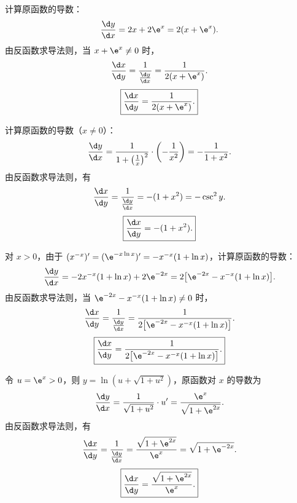 \begin{solution}

    计算原函数的导数：
    \begin{equation}
        \frac{\d y}{\d x} = 2x + 2\e^x = 2(x + \e^x).
    \end{equation}
    由反函数求导法则，当 $x + \e^x \neq 0$ 时，
    \begin{equation}
        \frac{\d x}{\d y} = \frac{1}{\frac{\d y}{\d x}} = \frac{1}{2(x + \e^x)}.
    \end{equation}
    \begin{equation}
        \boxed{\frac{\d x}{\d y} = \frac{1}{2(x + \e^x)}.}
    \end{equation}


    计算原函数的导数（$x \neq 0$）：
    \begin{equation}
        \frac{\d y}{\d x} = \frac{1}{1 + \left(\frac{1}{x}\right)^2} \cdot \left( -\frac{1}{x^2} \right) = -\frac{1}{1 + x^2}.
    \end{equation}
    由反函数求导法则，有
    \begin{equation}
        \frac{\d x}{\d y} = \frac{1}{\frac{\d y}{\d x}} = -(1 + x^2) = -\csc^2 y.
    \end{equation}
    \begin{equation}
        \boxed{\frac{\d x}{\d y} = -(1 + x^2).}
    \end{equation}


    对 $x > 0$，由于 $(x^{-x})' = (\e^{-x\ln x})' = -x^{-x}(1 + \ln x)$，计算原函数的导数：
    \begin{equation}
        \frac{\d y}{\d x} = -2x^{-x}(1 + \ln x) + 2\e^{-2x} = 2\bigl[ \e^{-2x} - x^{-x}(1 + \ln x) \bigr].
    \end{equation}
    由反函数求导法则，当 $\e^{-2x} - x^{-x}(1 + \ln x) \neq 0$ 时，
    \begin{equation}
        \frac{\d x}{\d y} = \frac{1}{\frac{\d y}{\d x}} = \frac{1}{2\bigl[ \e^{-2x} - x^{-x}(1 + \ln x) \bigr]}.
    \end{equation}
    \begin{equation}
        \boxed{\frac{\d x}{\d y} = \frac{1}{2\bigl[ \e^{-2x} - x^{-x}(1 + \ln x) \bigr]}.}
    \end{equation}


    令 $u = \e^x > 0$，则 $y = \ln(u + \sqrt{1+u^2})$，原函数对 $x$ 的导数为
    \begin{equation}
        \frac{\d y}{\d x} = \frac{1}{\sqrt{1 + u^2}} \cdot u' = \frac{\e^x}{\sqrt{1 + \e^{2x}}}.
    \end{equation}
    由反函数求导法则，有
    \begin{equation}
        \frac{\d x}{\d y} = \frac{1}{\frac{\d y}{\d x}} = \frac{\sqrt{1 + \e^{2x}}}{\e^x} = \sqrt{1 + \e^{-2x}}.
    \end{equation}
    \begin{equation}
        \boxed{\frac{\d x}{\d y} = \frac{\sqrt{1+\e^{2x}}}{\e^x}.}
    \end{equation}
\end{solution}

